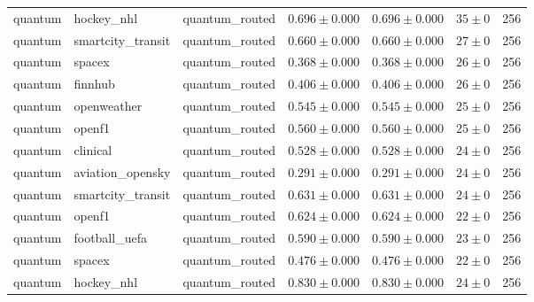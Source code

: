 \begin{table}[htbp]
\begin{tabular}{l l l r r r r}
quantum & hockey\_nhl & quantum\_routed & $0.696\pm0.000$ & $0.696\pm0.000$ & $35\pm0$ & 256 \\
quantum & smartcity\_transit & quantum\_routed & $0.660\pm0.000$ & $0.660\pm0.000$ & $27\pm0$ & 256 \\
quantum & spacex & quantum\_routed & $0.368\pm0.000$ & $0.368\pm0.000$ & $26\pm0$ & 256 \\
quantum & finnhub & quantum\_routed & $0.406\pm0.000$ & $0.406\pm0.000$ & $26\pm0$ & 256 \\
quantum & openweather & quantum\_routed & $0.545\pm0.000$ & $0.545\pm0.000$ & $25\pm0$ & 256 \\
quantum & openf1 & quantum\_routed & $0.560\pm0.000$ & $0.560\pm0.000$ & $25\pm0$ & 256 \\
quantum & clinical & quantum\_routed & $0.528\pm0.000$ & $0.528\pm0.000$ & $24\pm0$ & 256 \\
quantum & aviation\_opensky & quantum\_routed & $0.291\pm0.000$ & $0.291\pm0.000$ & $24\pm0$ & 256 \\
quantum & smartcity\_transit & quantum\_routed & $0.631\pm0.000$ & $0.631\pm0.000$ & $24\pm0$ & 256 \\
quantum & openf1 & quantum\_routed & $0.624\pm0.000$ & $0.624\pm0.000$ & $22\pm0$ & 256 \\
quantum & football\_uefa & quantum\_routed & $0.590\pm0.000$ & $0.590\pm0.000$ & $23\pm0$ & 256 \\
quantum & spacex & quantum\_routed & $0.476\pm0.000$ & $0.476\pm0.000$ & $22\pm0$ & 256 \\
quantum & hockey\_nhl & quantum\_routed & $0.830\pm0.000$ & $0.830\pm0.000$ & $24\pm0$ & 256 \\
\hline
\end{tabular}
\end{table}
